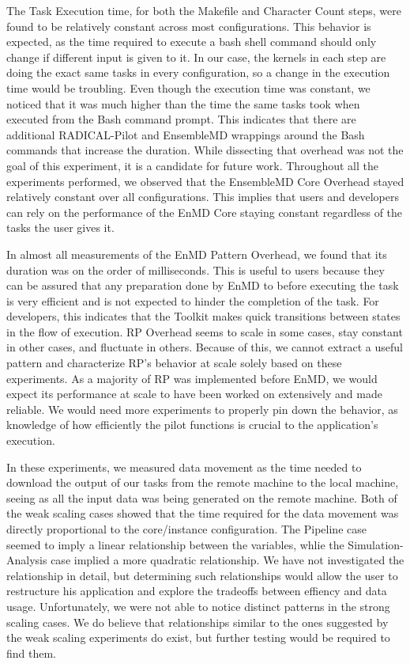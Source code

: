 \documentclass[]{article}
\begin{document}
	The Task Execution time, for both the Makefile and Character Count steps, were found to be relatively constant across most configurations. This behavior is expected, as the time required to execute a bash shell command should only change if different input is given to it. In our case, the kernels in each step are doing the exact same tasks in every configuration, so a change in the execution time would be troubling. Even though the execution time was constant, we noticed that it was much higher than the time the same tasks took when executed from the Bash command prompt. This indicates that there are additional RADICAL-Pilot and EnsembleMD wrappings around the Bash commands that increase the duration. While dissecting that overhead was not the goal of this experiment, it is a candidate for future work.
	Throughout all the experiments performed, we observed that the EnsembleMD Core Overhead stayed relatively constant over all configurations. This implies that users and developers can rely on the performance of the EnMD Core staying constant regardless of the tasks the user gives it.
	
	In almost all measurements of the EnMD Pattern Overhead, we found that its duration was on the order of milliseconds. This is useful to users because they can be assured that any preparation done by EnMD to before executing the task is very efficient and is not expected to hinder the completion of the task. For developers, this indicates that the Toolkit makes quick transitions between states in the flow of execution.
	RP Overhead seems to scale in some cases, stay constant in other cases, and fluctuate in others. Because of this, we cannot extract a useful pattern and characterize RP's behavior at scale solely based on these experiments. As a majority of RP was implemented before EnMD, we would expect its performance at scale to have been worked on extensively and made reliable. We would need more experiments to properly pin down the behavior, as knowledge of how efficiently the pilot functions is crucial to the application's execution.

    In these experiments, we measured data movement as the time needed to download the output of our tasks from the remote machine to the local machine, seeing as all the input data was being generated on the remote machine. Both of the weak scaling cases showed that the time required for the data movement was directly proportional to the core/instance configuration. The Pipeline case seemed to imply a linear relationship between the variables, whlie the Simulation-Analysis case implied a more quadratic relationship. We have not investigated the relationship in detail, but determining such relationships would allow the user to restructure his application and explore the tradeoffs between effiency and data usage. Unfortunately, we were not able to notice distinct patterns in the strong scaling cases. We do believe that relationships similar to the ones suggested by the weak scaling experiments do exist, but further testing would be required to find them.
\end{document}
